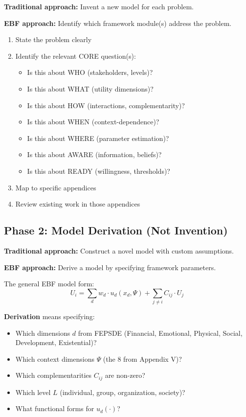 \textbf{Traditional approach:} Invent a new model for each problem.

\textbf{EBF approach:} Identify which framework module(s) address the problem.

\begin{tcolorbox}[colback=gray!5!white, colframe=gray!75!black,
    title=\textbf{Phase 1 Checklist}]
\begin{enumerate}[nosep]
    \item State the problem clearly
    \item Identify the relevant CORE question(s):
    \begin{itemize}[nosep]
        \item Is this about WHO (stakeholders, levels)?
        \item Is this about WHAT (utility dimensions)?
        \item Is this about HOW (interactions, complementarity)?
        \item Is this about WHEN (context-dependence)?
        \item Is this about WHERE (parameter estimation)?
        \item Is this about AWARE (information, beliefs)?
        \item Is this about READY (willingness, thresholds)?
    \end{itemize}
    \item Map to specific appendices
    \item Review existing work in those appendices
\end{enumerate}
\end{tcolorbox}

\subsection{Phase 2: Model Derivation (Not Invention)}

\textbf{Traditional approach:} Construct a novel model with custom assumptions.

\textbf{EBF approach:} Derive a model by specifying framework parameters.

The general EBF model form:
\begin{equation}
U_i = \sum_d w_d \cdot u_d(x_d, \Psi) + \sum_{j \neq i} C_{ij} \cdot U_j
\label{eq:general-ebf}
\end{equation}

\textbf{Derivation} means specifying:
\begin{itemize}[nosep]
    \item Which dimensions $d$ from FEPSDE (Financial, Emotional, Physical, Social, Development, Existential)?
    \item Which context dimensions $\Psi$ (the 8 from Appendix V)?
    \item Which complementarities $C_{ij}$ are non-zero?
    \item Which level $L$ (individual, group, organization, society)?
    \item What functional forms for $u_d(\cdot)$?
\end{itemize}

